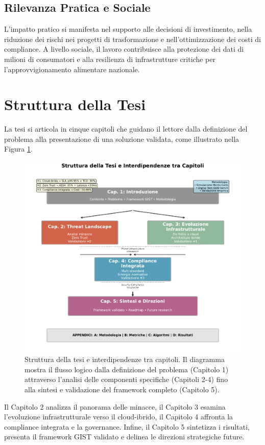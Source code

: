 \subsection{Rilevanza Pratica e Sociale}
L'impatto pratico si manifesta nel supporto alle decisioni di investimento, nella riduzione dei rischi nei progetti di trasformazione e nell'ottimizzazione dei costi di compliance. A livello sociale, il lavoro contribuisce alla protezione dei dati di milioni di consumatori e alla resilienza di infrastrutture critiche per l'approvvigionamento alimentare nazionale.

\section{Struttura della Tesi}
La tesi si articola in cinque capitoli che guidano il lettore dalla definizione del problema alla presentazione di una soluzione validata, come illustrato nella Figura \ref{fig:thesis_structure}.

\begin{figure}[htbp]
\centering
\includegraphics[width=1\textwidth]{thesis_figures/cap1/fig_1_4_thesis_structure.pdf}
\caption{Struttura della tesi e interdipendenze tra capitoli. Il diagramma mostra il flusso logico dalla definizione del problema (Capitolo 1) attraverso l'analisi delle componenti specifiche (Capitoli 2-4) fino alla sintesi e validazione del framework completo (Capitolo 5).}
\label{fig:thesis_structure}
\end{figure}

Il Capitolo 2 analizza il panorama delle minacce, il Capitolo 3 esamina l'evoluzione infrastrutturale verso il cloud-ibrido, il Capitolo 4 affronta la compliance integrata e la governance. Infine, il Capitolo 5 sintetizza i risultati, presenta il framework GIST validato e delinea le direzioni strategiche future.

\clearpage
\printbibliography[
    heading=subbibliography,
    title={Riferimenti Bibliografici del Capitolo 1},
]

\endrefsection
